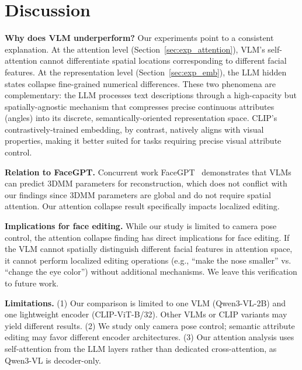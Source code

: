 \documentclass[10pt,twocolumn,letterpaper]{article}
\begin{document}
\section{Discussion}
\label{sec:disc}

\textbf{Why does VLM underperform?} Our experiments point to a consistent explanation. At the attention level (Section~\ref{sec:exp_attention}), VLM's self-attention cannot differentiate spatial locations corresponding to different facial features. At the representation level (Section~\ref{sec:exp_emb}), the LLM hidden states collapse fine-grained numerical differences. These two phenomena are complementary: the LLM processes text descriptions through a high-capacity but spatially-agnostic mechanism that compresses precise continuous attributes (angles) into its discrete, semantically-oriented representation space. CLIP's contrastively-trained embedding, by contrast, natively aligns with visual properties, making it better suited for tasks requiring precise visual attribute control.

\textbf{Relation to FaceGPT.} Concurrent work FaceGPT~\cite{FaceGPT} demonstrates that VLMs can predict 3DMM parameters for reconstruction, which does not conflict with our findings since 3DMM parameters are global and do not require spatial attention. Our attention collapse result specifically impacts localized editing.

\noindent\textbf{Implications for face editing.} While our study is limited to camera pose control, the attention collapse finding has direct implications for face editing. If the VLM cannot spatially distinguish different facial features in attention space, it cannot perform localized editing operations (e.g., ``make the nose smaller'' vs. ``change the eye color'') without additional mechanisms. We leave this verification to future work.

\textbf{Limitations.} (1) Our comparison is limited to one VLM (Qwen3-VL-2B) and one lightweight encoder (CLIP-ViT-B/32). Other VLMs or CLIP variants may yield different results. (2) We study only camera pose control; semantic attribute editing may favor different encoder architectures. (3) Our attention analysis uses self-attention from the LLM layers rather than dedicated cross-attention, as Qwen3-VL is decoder-only.

\end{document}
